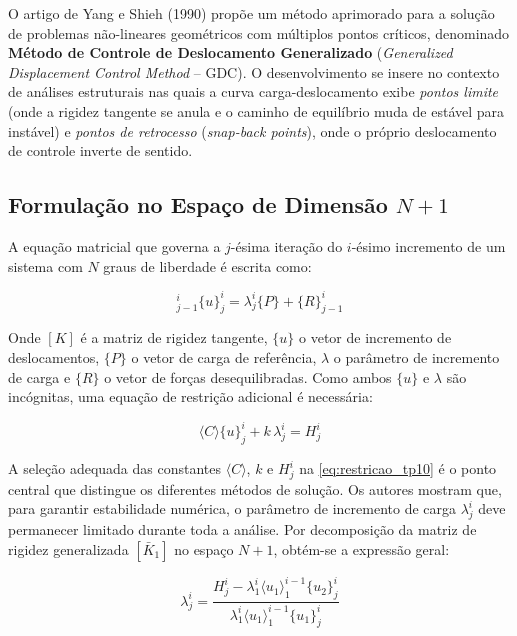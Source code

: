 \begin{textocaixa}

\hspace{10mm}
O artigo de Yang e Shieh (1990) propõe um método aprimorado para a solução de problemas
não-lineares geométricos com múltiplos pontos críticos, denominado \textbf{Método de
Controle de Deslocamento Generalizado} (\textit{Generalized Displacement Control Method} --
GDC). O desenvolvimento se insere no contexto de análises estruturais nas quais a curva
carga-deslocamento exibe \textit{pontos limite} (onde a rigidez tangente se anula e o caminho
de equilíbrio muda de estável para instável) e \textit{pontos de retrocesso}
(\textit{snap-back points}), onde o próprio deslocamento de controle inverte de sentido.

\subsection*{Formulação no Espaço de Dimensão $N+1$}

A equação matricial que governa a $j$-ésima iteração do $i$-ésimo incremento de um sistema
com $N$ graus de liberdade é escrita como:

\begin{equation}
	[K]^{i}_{j-1}\{u\}^{i}_{j} = \lambda^{i}_{j}\{P\} + \{R\}^{i}_{j-1}
\end{equation}

Onde $[K]$ é a matriz de rigidez tangente, $\{u\}$ o vetor de incremento de deslocamentos,
$\{P\}$ o vetor de carga de referência, $\lambda$ o parâmetro de incremento de carga e
$\{R\}$ o vetor de forças desequilibradas. Como ambos $\{u\}$ e $\lambda$ são incógnitas,
uma equação de restrição adicional é necessária:

\begin{equation}
	\langle C \rangle \{u\}^{i}_{j} + k\,\lambda^{i}_{j} = H^{i}_{j}
	\label{eq:restricao_tp10}
\end{equation}

A seleção adequada das constantes $\langle C \rangle$, $k$ e $H^i_j$ na
\autoref{eq:restricao_tp10} é o ponto central que distingue os diferentes métodos de solução.
Os autores mostram que, para garantir estabilidade numérica, o parâmetro de incremento de
carga $\lambda^i_j$ deve permanecer limitado durante toda a análise. Por decomposição da
matriz de rigidez generalizada $[\bar{K}_1]$ no espaço $N+1$, obtém-se a expressão geral:

\begin{equation}
	\lambda^{i}_{j} = \frac{H^{i}_{j} - \lambda^{i}_{1}
					       \langle u_1 \rangle^{i-1}_{1}\{u_2\}^{i}_{j}}
						   {\lambda^{i}_{1}\langle u_1 \rangle^{i-1}_{1}\{u_1\}^{i}_{j}}
	\label{eq:lambda_tp10}
\end{equation}


\end{textocaixa}
